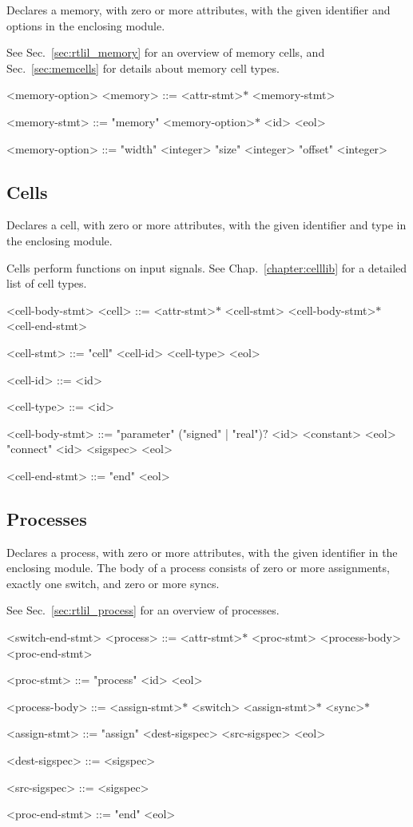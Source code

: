 Declares a memory, with zero or more attributes, with the given identifier and options in the enclosing module.

See Sec.~\ref{sec:rtlil_memory} for an overview of memory cells, and Sec.~\ref{sec:memcells} for details about memory cell types.

\begin{indentgrammar}{<memory-option>}
<memory> ::= <attr-stmt>$*$ <memory-stmt>

<memory-stmt> ::= "memory" <memory-option>$*$ <id> <eol>

<memory-option> ::= 
"width" <integer>
  \alt "size" <integer>
  \alt "offset" <integer>
\end{indentgrammar}

\subsection{Cells}

Declares a cell, with zero or more attributes, with the given identifier and type in the enclosing module. 

Cells perform functions on input signals. See Chap.~\ref{chapter:celllib} for a detailed list of cell types.

\begin{indentgrammar}{<cell-body-stmt>}
<cell> ::= <attr-stmt>$*$ <cell-stmt> <cell-body-stmt>$*$ <cell-end-stmt>

<cell-stmt> ::= "cell" <cell-id> <cell-type> <eol>

<cell-id> ::= <id>

<cell-type> ::= <id>

<cell-body-stmt> ::= 
"parameter" ("signed" | "real")$?$ <id> <constant> <eol>
  \alt "connect" <id> <sigspec> <eol>

<cell-end-stmt> ::= "end" <eol>
\end{indentgrammar}

\subsection{Processes}

Declares a process, with zero or more attributes, with the given identifier in the enclosing module. The body of a process consists of zero or more assignments, exactly one switch, and zero or more syncs.

See Sec.~\ref{sec:rtlil_process} for an overview of processes.

\begin{indentgrammar}{<switch-end-stmt>}
<process> ::= <attr-stmt>$*$ <proc-stmt> <process-body> <proc-end-stmt>

<proc-stmt> ::= "process" <id> <eol>

<process-body> ::= <assign-stmt>$*$ <switch> <assign-stmt>$*$ <sync>$*$

<assign-stmt> ::= "assign" <dest-sigspec> <src-sigspec> <eol>

<dest-sigspec> ::= <sigspec>

<src-sigspec> ::= <sigspec>

<proc-end-stmt> ::= "end" <eol>

\end{indentgrammar}

